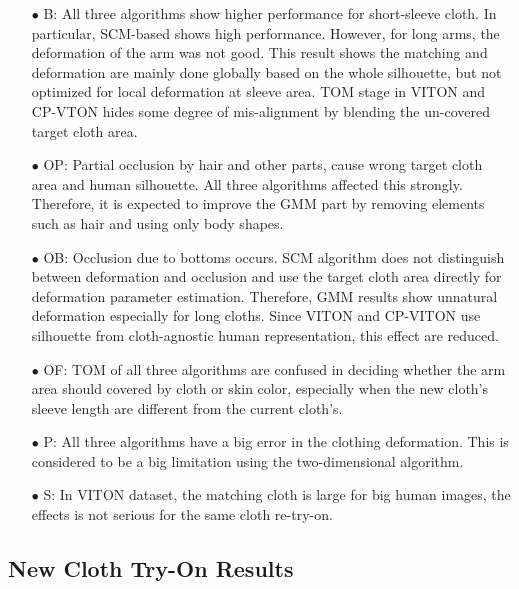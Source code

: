 \begin{itemize}

\item[$\bullet$] B: All three algorithms show higher performance for short-sleeve cloth. In particular, SCM-based shows high performance. However, for long arms, the deformation of the arm was not good. This result shows the matching and deformation are mainly done globally based on the whole silhouette, but not optimized for local deformation at sleeve area. TOM stage in VITON and CP-VTON hides some degree of mis-alignment by blending the un-covered target cloth area.   %

\item[$\bullet$] OP: Partial occlusion by hair and other parts, cause wrong target cloth area and human silhouette. All three algorithms affected this strongly. Therefore, it is expected to improve the GMM part by removing elements such as hair and using only body shapes.

\item[$\bullet$] OB: Occlusion due to bottoms occurs. SCM algorithm does not distinguish between deformation and occlusion and use the target cloth area directly for deformation parameter estimation.  Therefore, GMM results show unnatural deformation especially for long cloths. Since VITON and CP-VITON use silhouette from cloth-agnostic human representation, this effect are reduced.

\item[$\bullet$] OF: TOM of all three algorithms are confused in deciding whether the arm area should covered by cloth or skin color, especially when the new cloth's sleeve length are different from the current cloth's.  

\item[$\bullet$] P: All three algorithms have a big error in the clothing deformation. This is considered to be a big limitation using the two-dimensional algorithm.

\item[$\bullet$] S: In VITON dataset, the matching cloth is large for big human images, the effects is not serious for the same cloth re-try-on.
\end{itemize}

\subsection{ New Cloth Try-On Results }
 
